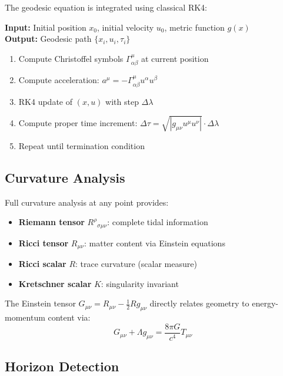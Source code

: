 \documentclass[12pt, a4paper]{article}
\begin{document}
The geodesic equation is integrated using classical RK4:

\begin{algorithm}
\textbf{Input:} Initial position $x_0$, initial velocity $u_0$, metric function $g(x)$ \\
\textbf{Output:} Geodesic path $\{x_i, u_i, \tau_i\}$

\begin{enumerate}
    \item Compute Christoffel symbols $\Gamma^\mu_{\alpha\beta}$ at current position
    \item Compute acceleration: $a^\mu = -\Gamma^\mu_{\alpha\beta} u^\alpha u^\beta$
    \item RK4 update of $(x, u)$ with step $\Delta\lambda$
    \item Compute proper time increment:
          $\Delta\tau = \sqrt{|g_{\mu\nu} u^\mu u^\nu|} \cdot \Delta\lambda$
    \item Repeat until termination condition
\end{enumerate}
\end{algorithm}

\subsection{Curvature Analysis}

Full curvature analysis at any point provides:
\begin{itemize}
    \item \textbf{Riemann tensor} $R^\rho{}_{\sigma\mu\nu}$: complete tidal information
    \item \textbf{Ricci tensor} $R_{\mu\nu}$: matter content via Einstein equations
    \item \textbf{Ricci scalar} $R$: trace curvature (scalar measure)
    \item \textbf{Kretschner scalar} $K$: singularity invariant
\end{itemize}

The Einstein tensor $G_{\mu\nu} = R_{\mu\nu} - \frac{1}{2}Rg_{\mu\nu}$ directly
relates geometry to energy-momentum content via:
\begin{equation}
    G_{\mu\nu} + \Lambda g_{\mu\nu} = \frac{8\pi G}{c^4} T_{\mu\nu}
\end{equation}

\subsection{Horizon Detection}
\end{document}
